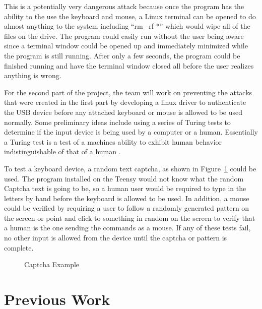 \documentclass{ieee}
\begin{document}
This is a potentially very dangerous attack because once the program has the ability to the use the keyboard and mouse, a Linux terminal can be opened to do almost anything to the system including ``rm –rf *'' which would wipe all of the files on the drive. The program could easily run without the user being aware since a terminal window could be opened up and immediately minimized while the program is still running. After only a few seconds, the program could be finished running and have the terminal window closed all before the user realizes anything is wrong.

For the second part of the project, the team will work on preventing the attacks that were created in the first part by developing a linux driver to authenticate the USB device before any attached keyboard or mouse is allowed to be used normally. Some preliminary ideas include using a series of Turing tests to determine if the input device is being used by a computer or a human. Essentially a Turing test is a test of a machines ability to exhibit human behavior indistinguishable of that of a human \cite{wiki}.

To test a keyboard device, a random text captcha, as shown in  Figure~\ref{fig:Captcha} could be used. The program installed on the Teensy would not know what the random Captcha text is going to be, so a human user would be required to type in the letters by hand before the keyboard is allowed to be used. In addition, a mouse could be verified by requiring a user to follow a randomly generated pattern on the screen or point and click to something in random on the screen to verify that a human is the one sending the commands as a mouse. If any of these tests fail, no other input is allowed from the device until the captcha or pattern is complete.

\begin{figure}[H]
   \caption{Captcha Example}
   \label{fig:Captcha}
\end{figure}

\section{Previous Work}
\end{document}
